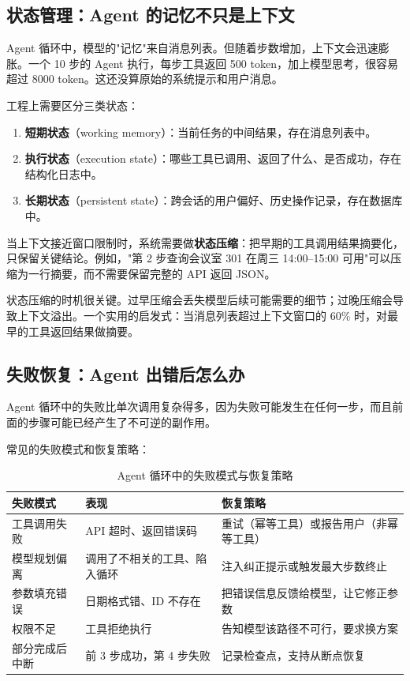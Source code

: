 \subsection{状态管理：Agent 的记忆不只是上下文}
Agent 循环中，模型的"记忆"来自消息列表。但随着步数增加，上下文会迅速膨胀。一个 10 步的 Agent 执行，每步工具返回 500 token，加上模型思考，很容易超过 8000 token。这还没算原始的系统提示和用户消息。

工程上需要区分三类状态：

\begin{enumerate}
  \item \textbf{短期状态}（working memory）：当前任务的中间结果，存在消息列表中。
  \item \textbf{执行状态}（execution state）：哪些工具已调用、返回了什么、是否成功，存在结构化日志中。
  \item \textbf{长期状态}（persistent state）：跨会话的用户偏好、历史操作记录，存在数据库中。
\end{enumerate}

当上下文接近窗口限制时，系统需要做\textbf{状态压缩}：把早期的工具调用结果摘要化，只保留关键结论。例如，"第 2 步查询会议室 301 在周三 14:00--15:00 可用"可以压缩为一行摘要，而不需要保留完整的 API 返回 JSON。

\begin{note}
状态压缩的时机很关键。过早压缩会丢失模型后续可能需要的细节；过晚压缩会导致上下文溢出。一个实用的启发式：当消息列表超过上下文窗口的 60\% 时，对最早的工具返回结果做摘要。
\end{note}

\subsection{失败恢复：Agent 出错后怎么办}
Agent 循环中的失败比单次调用复杂得多，因为失败可能发生在任何一步，而且前面的步骤可能已经产生了不可逆的副作用。

常见的失败模式和恢复策略：

\begin{table}[H]
\centering
\small
\begin{tabularx}{\textwidth}{>{\raggedright\arraybackslash}p{3cm}>{\raggedright\arraybackslash}p{3.5cm}>{\raggedright\arraybackslash}X}
\toprule
\textbf{失败模式} & \textbf{表现} & \textbf{恢复策略} \\
\midrule
工具调用失败 & API 超时、返回错误码 & 重试（幂等工具）或报告用户（非幂等工具） \\
模型规划偏离 & 调用了不相关的工具、陷入循环 & 注入纠正提示或触发最大步数终止 \\
参数填充错误 & 日期格式错、ID 不存在 & 把错误信息反馈给模型，让它修正参数 \\
权限不足 & 工具拒绝执行 & 告知模型该路径不可行，要求换方案 \\
部分完成后中断 & 前 3 步成功，第 4 步失败 & 记录检查点，支持从断点恢复 \\
\bottomrule
\end{tabularx}
\caption{Agent 循环中的失败模式与恢复策略}
\label{tab:agent-failure-recovery}
\end{table}

